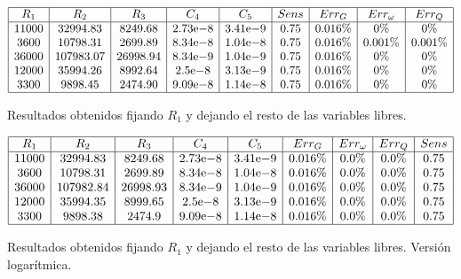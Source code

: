 \documentclass{llncs}
\newcommand{\expnumber}[2]{{#1}\mathrm{e}{#2}}
\begin{document}
	\begin{table}[H]
		$$
		\begin{array}{|c|c|c|c|c|c|c|c|c|c|}
		\hline
		R_1 & R_2 & R_3 & C_4 & C_5 & Sens & Err_G & Err_\omega & Err_Q \\
		\hline
		11000 & 32994.83 & 8249.68 & \expnumber{2.73}{-8} & \expnumber{3.41}{-9} & 0.75 & 0.016\% & 0\% & 0\% \\
		3600 & 10798.31 & 2699.89 & \expnumber{8.34}{-8} & \expnumber{1.04}{-8} & 0.75 & 0.016\% & 0.001\% & 0.001\% \\
		36000 & 107983.07 & 26998.94 & \expnumber{8.34}{-9} & \expnumber{1.04}{-9} & 0.75 & 0.016\% & 0\% & 0\% \\
		12000 & 35994.26 & 8992.64 & \expnumber{2.5}{-8} & \expnumber{3.13}{-9} & 0.75 & 0.016\% & 0\% & 0\% \\
		3300 & 9898.45 & 2474.90 & \expnumber{9.09}{-8} & \expnumber{1.14}{-8} & 0.75 & 0.016\% & 0\% & 0\% \\
		\hline
		\end{array}
		$$
		\caption{Resultados obtenidos fijando $R_1$ y dejando el resto de las variables libres.}
		\label{cuadroSolsCom}
	\end{table}

	\begin{table}[H]
		$$
		\begin{array}{|c|c|c|c|c|c|c|c|c|c|}
		\hline
		R_1 & R_2 & R_3 & C_4 & C_5 & Err_G & Err_\omega & Err_Q & Sens\\
		\hline		
		11000 & 32994.83 & 8249.68 & \expnumber{2.73}{-8} & \expnumber{3.41}{-9} & 0.016\% & 0.0\% & 0.0\% & 0.75 \\
		3600 & 10798.31 & 2699.89 & \expnumber{8.34}{-8} & \expnumber{1.04}{-8} & 0.016\% & 0.0\% & 0.0\% & 0.75 \\
		36000 & 107982.84 & 26998.93 & \expnumber{8.34}{-9} & \expnumber{1.04}{-9} & 0.016\% & 0.0\% & 0.0\% & 0.75 \\
		12000 & 35994.35 & 8999.65 & \expnumber{2.5}{-8} & \expnumber{3.13}{-9} & 0.016\% & 0.0\% & 0.0\% & 0.75 \\
		3300 & 9898.38 & 2474.9 & \expnumber{9.09}{-8} & \expnumber{1.14}{-8} & 0.016\% & 0.0\% & 0.0\% & 0.75 \\
		\hline
		\end{array}
		$$
		\caption{Resultados obtenidos fijando $R_1$ y dejando el resto de las variables libres. Versión logarítmica.}
		\label{cuadroSolsLog}
	\end{table}
	
\end{document}
